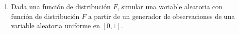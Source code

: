 \documentclass[letterpaper]{article}
\theoremstyle{definition}
\theoremstyle{lemathm}
\theoremstyle{lemathm}
\theoremstyle{lemathm}
\theoremstyle{lemademthm}
\newcommand{\pars}[1]{\left( #1 \right) }
\newcommand{\bracs}[1]{\left[ #1 \right] }
\newcommand{\PP}{\mathbb{P}}
\newcommand{\1}{\mathbbm{1}}
\begin{document}
\begin{enumerate}
		\begin{proof}
			\begin{align*}
				\PP\bracs{A^c \cap B} &= 1 - \PP\bracs{\pars{A^c \cap B}^c} &\text{Debido a que } \PP\bracs{X} = 1 - \PP\bracs{X^c}\\
				&= 1 - \pars{\PP\bracs{\pars{B^c \cup A}}} &\text{Ya que } \PP\bracs{\pars{A\cap B}^c} = \PP\bracs{A^c \cup B^c}\\
				&= 1 - \pars{\PP\bracs{\pars{B^c \cup A} \cap \pars{B^c \cup B}}} &\text{Puesto que } \PP\bracs{A\cup A^c} = \PP\bracs{\Omega}\\
				&= 1 - \pars{\PP\bracs{B^c \cup \pars{A\cap B}}} &\text{Por distribución}.\\
				&= 1 - \pars{\PP\bracs{B^c} + \PP\bracs{A\cap B}} &\text{Por sigmatividad de } \PP\\
				&= \PP\bracs{B} - \PP\bracs{A\cap B} &\text{Debido a que } \PP\bracs{X} = 1 - \PP\bracs{X^c}\\
				&= \PP\bracs{B} - \PP\bracs{A}\PP\bracs{B} &\text{Por hipotesis}\\
				&= \pars{1 - \PP\bracs{A}}\PP\bracs{B}\\
				&= \PP\bracs{A^c}\PP\bracs{B} &\text{Debido a que } \PP\bracs{X} = 1 - \PP\bracs{X^c}.
			\end{align*}
		\end{proof}

		\item Dada una función de distribución $F$, simular una variable aleatoria con función de distribución $F$ a partir de un generador de observaciones de una variable aleatoria uniforme en $[0,1]$.
	\end{enumerate}
\end{document}
